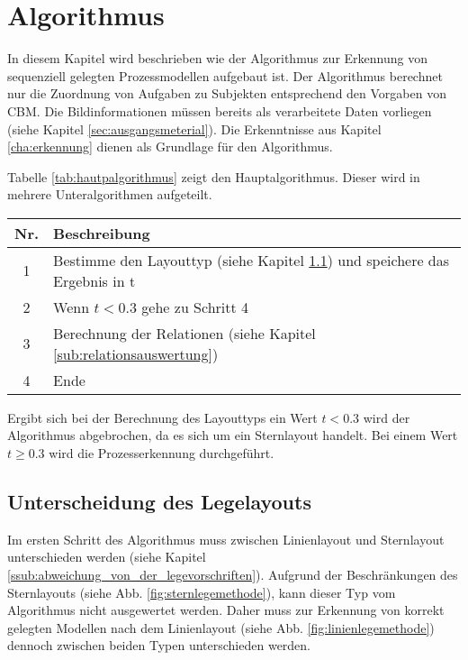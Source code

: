 %
%
% 
% 
% 

\chapter{Algorithmus} 
\label{cap:algorithmus}
In diesem Kapitel wird beschrieben wie der Algorithmus zur Erkennung von sequenziell gelegten Prozessmodellen aufgebaut ist. Der Algorithmus berechnet nur die Zuordnung von Aufgaben zu Subjekten entsprechend den Vorgaben von CBM. Die Bildinformationen müssen bereits als verarbeitete Daten vorliegen (siehe Kapitel \ref{sec:ausgangsmeterial}). Die Erkenntnisse aus Kapitel \ref{cha:erkennung} dienen als Grundlage für den Algorithmus.

Tabelle \ref{tab:hautpalgorithmus} zeigt den Hauptalgorithmus. Dieser wird in mehrere Unteralgorithmen aufgeteilt. 

\begin{center}
	\label{tab:hautpalgorithmus}
	\begin{tabularx}
		{1.0\linewidth}{ c X } \textbf{Nr.} & \textbf{Beschreibung} \\
		\hline 1 & Bestimme den Layouttyp (siehe Kapitel  \ref{sub:unterscheidung_der_legemethoden}) und speichere das Ergebnis in t\\
		\hline 2 & Wenn $t < 0.3$ gehe zu Schritt 4 \\
		\hline 3 & Berechnung der Relationen (siehe Kapitel \ref{sub:relationsauswertung})\\
		\hline 4 & Ende
	\end{tabularx}
\end{center}

Ergibt sich bei der Berechnung des Layouttyps ein Wert $t<0.3$ wird der Algorithmus abgebrochen, da es sich um ein Sternlayout handelt. Bei einem Wert $t \geq 0.3$ wird die Prozesserkennung durchgeführt.

\section{Unterscheidung des Legelayouts} %
\label{sub:unterscheidung_der_legemethoden}
Im ersten Schritt des Algorithmus muss zwischen Linienlayout und Sternlayout unterschieden werden (siehe Kapitel \ref{ssub:abweichung_von_der_legevorschriften}). Aufgrund der Beschränkungen des Sternlayouts (siehe Abb. \ref{fig:sternlegemethode}), kann dieser Typ vom Algorithmus nicht ausgewertet werden. Daher muss zur Erkennung von korrekt gelegten Modellen nach dem Linienlayout (siehe Abb. \ref{fig:linienlegemethode}) dennoch zwischen beiden Typen unterschieden werden.

